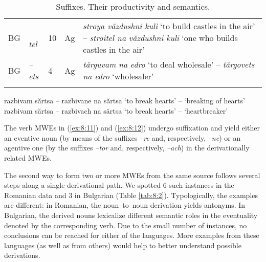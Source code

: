 \documentclass[output=paper]{langsci/langscibook}
\begin{document}
\begin{table}[H]
\begin{tabular}{p{0.4cm}p{1cm}p{0.5cm}p{1cm}p{6.9cm}}
{ BG} &
{ \textit{–tel}} &
{ 10} &
{ Ag} &
{ \textit{stroya văzdushni kuli} ‘to build
castles in the air’ – \textit{stroitel na văzdushni kuli} ‘one who builds
castles in the air’}\\

{ BG} &
{ \textit{–ets}} &
{ 4} &
{ Ag} &
{ \textit{tărguvam na edro} ‘to deal
wholesale’ – \textit{tărgovets na edro} ‘wholesaler’}\\
\lspbottomrule
\end{tabular}
\caption{Suffixes. Their productivity and semantics.}
\label{tab:8:1}
\end{table}



\begin{exe}
\ex \label{ex:8:12}
\settowidth{}
\begin{xlist}
\ex \label{ex:8:12a} 
razbivam sărtsa  – razbivane na sărtsa 
‘to break hearts’ – ‘breaking of hearts’ 
\ex \label{ex:8:12b} 
razbivam sărtsa  – razbivach na sărtsa  
‘to break hearts’ – ‘heartbreaker’ 
\end{xlist}
\end{exe}




The verb MWEs in (\ref{ex:8:11}) and (\ref{ex:8:12}) undergo suffixation and yield either an
eventive noun (by means of the suffixes \textit{–re} and, respectively, \textit{–ne})
or an agentive one (by the suffixes \textit{–tor} and, respectively, \textit{–ach})
in the derivationally related MWEs. 



The second way to form two or more MWEs from the same source follows
several steps along a single derivational path. We spotted 6 such
instances in the Romanian data and 3 in Bulgarian (Table \ref{tab:8:2}).
Typologically, the examples are different: in Romanian, the
noun–to–noun derivation yields antonyms. In Bulgarian, the derived
nouns lexicalize different semantic roles in the eventuality denoted by
the corresponding verb. Due to the small number of instances, no
conclusions can be reached for either of the languages. More examples
from these languages (as well as from others) would help to better
understand possible derivations. 
\end{document}
